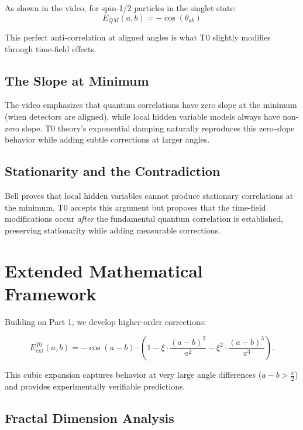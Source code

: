 As shown in the video, for spin-1/2 particles in the singlet state:
\begin{equation}
E_{QM}(a,b) = -\cos(\theta_{ab})
\end{equation}

This perfect anti-correlation at aligned angles is what T0 slightly modifies through time-field effects.

\subsection{The Slope at Minimum}

The video emphasizes that quantum correlations have zero slope at the minimum (when detectors are aligned), while local hidden variable models always have non-zero slope. T0 theory's exponential damping naturally reproduces this zero-slope behavior while adding subtle corrections at larger angles.

\subsection{Stationarity and the Contradiction}

Bell proves that local hidden variables cannot produce stationary correlations at the minimum. T0 accepts this argument but proposes that the time-field modifications occur \textit{after} the fundamental quantum correlation is established, preserving stationarity while adding measurable corrections.

\section{Extended Mathematical Framework}
\label{sec:extended_math}

Building on Part 1, we develop higher-order corrections:

\begin{equation}
E^{T0}_{\text{ext}}(a,b) = -\cos(a-b) \cdot \left(1 - \xi \cdot \frac{(a-b)^2}{\pi^2} - \xi^2 \cdot \frac{(a-b)^3}{\pi^3}\right).
\label{eq:cubic_expansion}
\end{equation}

This cubic expansion captures behavior at very large angle differences ($a-b > \frac{\pi}{2}$) and provides experimentally verifiable predictions.

\subsection{Fractal Dimension Analysis}

